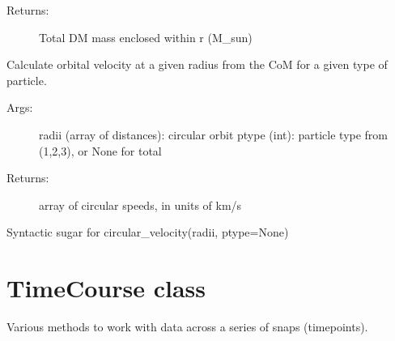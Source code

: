 \documentclass[letterpaper,10pt,english]{sphinxmanual}
\begin{document}
\begin{fulllineitems}
\begin{fulllineitems}
\begin{description}
\item[{Returns:}] \leavevmode
Total DM mass enclosed within r (M\_sun)

\end{description}

\end{fulllineitems}


\begin{fulllineitems}
\label{\detokenize{massprofile:galaxy.massprofile.MassProfile.circular_velocity}}
Calculate orbital velocity at a given radius from the CoM 
for a given type of particle.
\begin{description}
\item[{Args:}] \leavevmode
radii (array of distances): circular orbit
ptype (int): particle type from (1,2,3), or None for total

\item[{Returns:}] \leavevmode
array of circular speeds, in units of km/s

\end{description}

\end{fulllineitems}


\begin{fulllineitems}
\label{\detokenize{massprofile:galaxy.massprofile.MassProfile.circular_velocity_total}}
Syntactic sugar for circular\_velocity(radii, ptype=None)

\end{fulllineitems}


\end{fulllineitems}

\label{\detokenize{timecourse:module-galaxy.timecourse}}

\chapter{TimeCourse class}
\label{\detokenize{timecourse:timecourse-class}}\label{\detokenize{timecourse::doc}}
Various methods to work with data across a series of snaps (timepoints).
\end{document}
